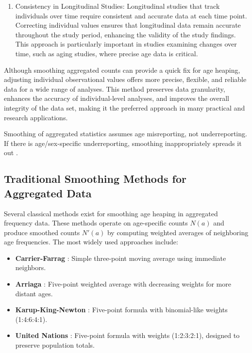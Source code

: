 \documentclass[12pt]{article}
\theoremstyle{plain}
\theoremstyle{definition}
\begin{document}
\begin{enumerate}
\item Consistency in Longitudinal Studies:
   Longitudinal studies that track individuals over time require consistent and accurate data at each time point. Correcting individual values ensures that longitudinal data remain accurate throughout the study period, enhancing the validity of the study findings. This approach is particularly important in studies examining changes over time, such as aging studies, where precise age data is critical.
\end{enumerate}


Although smoothing aggregated counts can provide a quick fix for age heaping, adjusting individual observational values offers more precise, flexible, and reliable data for a wide range of analyses. This method preserves data granularity, enhances the accuracy of individual-level analyses, and improves the overall integrity of the data set, making it the preferred approach in many practical and research applications.


Smoothing of aggregated statistics assumes age misreporting, not underreporting. If there is age/sex-specific underreporting, smoothing inappropriately spreads it out \citep{preston1999}.




\subsection{Traditional Smoothing Methods for Aggregated Data}

Several classical methods exist for smoothing age heaping in aggregated frequency data. These methods operate on age-specific counts $N(a)$ and produce smoothed counts $N'(a)$ by computing weighted averages of neighboring age frequencies. The most widely used approaches include:

\begin{itemize}
    \item \textbf{Carrier-Farrag} \citep{carrier1959}: Simple three-point moving average using immediate neighbors.
    \item \textbf{Arriaga} \citep{arriaga1968}: Five-point weighted average with decreasing weights for more distant ages.
    \item \textbf{Karup-King-Newton} \citep{karup1903}: Five-point formula with binomial-like weights (1:4:6:4:1).
    \item \textbf{United Nations} \citep{un1956}: Five-point formula with weights (1:2:3:2:1), designed to preserve population totals.
\end{itemize}
\end{document}
